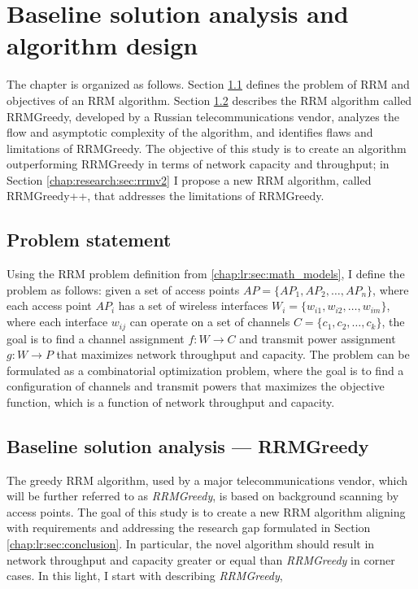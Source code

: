 \newcommand{\rrmG}{$\boldsymbol{G}$}

\chapter{Baseline solution analysis and algorithm design}
\label{chap:research}

The chapter is organized as follows. Section \ref{chap:research:sec:problem_statement} defines the problem of RRM and objectives of an RRM algorithm.
Section \ref{sec:baseline} describes the RRM algorithm called RRMGreedy, developed by a Russian telecommunications vendor, analyzes the flow and asymptotic complexity of the algorithm, and identifies flaws and limitations of RRMGreedy. The objective of this study is to create an algorithm outperforming RRMGreedy in terms of network capacity and throughput; in Section \ref{chap:research:sec:rrmv2} I propose a new RRM algorithm, called RRMGreedy++, that addresses the limitations of RRMGreedy.


\section{Problem statement}
\label{chap:research:sec:problem_statement}
Using the RRM problem definition from \ref{chap:lr:sec:math_models}, I define the problem as follows: given a set of access points $AP = \{AP_1, AP_2, \ldots, AP_n\}$, where each access point $AP_i$ has a set of wireless interfaces $W_i = \{w_{i1}, w_{i2}, \ldots, w_{im}\}$, where each interface $w_{ij}$ can operate on a set of channels $C = \{c_1, c_2, \ldots, c_k\}$, the goal is to find a channel assignment $f: W \to C$ and transmit power assignment $g: W \to P$ that maximizes network throughput and capacity. The problem can be formulated as a combinatorial optimization problem, where the goal is to find a configuration of channels and transmit powers that maximizes the objective function, which is a function of network throughput and capacity.

\section{Baseline solution analysis --- RRMGreedy}
\label{sec:baseline}
The greedy RRM algorithm, used by a major telecommunications vendor, which will be further referred to as \textit{RRMGreedy}, is based on background scanning by access points. The goal of this study is to create a new RRM algorithm aligning with requirements and addressing the research gap formulated in Section \ref{chap:lr:sec:conclusion}.
In particular, the novel algorithm should result in network throughput and capacity greater or equal than \textit{RRMGreedy} in corner cases. In this light, I start with describing \textit{RRMGreedy},

